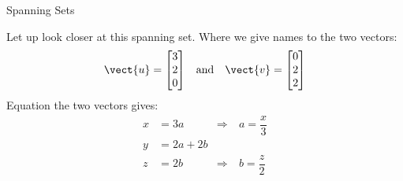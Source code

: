 \documentclass{beamer}
\begin{document}
\begin{frame}{Spanning Sets}
\begin{example}
\begin{overprint}
Let up look closer at this spanning set. Where we give names to the two vectors:
\begin{equation*}
\begin{aligned}
\vect{u}=
\begin{bmatrix}
3 \\
2 \\
0 \\
\end{bmatrix} 
& \quad\text{and} &
\vect{v}=
\begin{bmatrix}
0 \\
2 \\
2 \\
\end{bmatrix}
\end{aligned}
\end{equation*}
Equation the two vectors gives:
\begin{equation*}
\begin{aligned}
x&=3a    & \Rightarrow &\ a=\dfrac{x}{3}\\
y&=2a+2b &&\\
z&=2b    & \Rightarrow &\ b=\dfrac{z}{2}\\
\end{aligned}
\end{equation*}
\end{overprint}
\end{example}
\end{frame}
\end{document}
